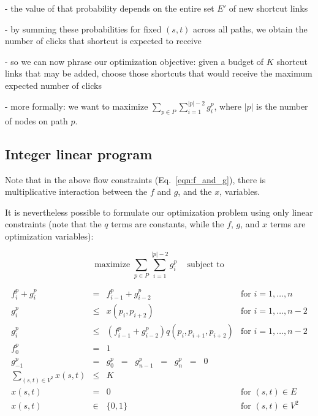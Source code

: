 \documentclass[11pt,letterpaper]{article}
\begin{document}
- the value of that probability depends on the entire set $E'$ of new shortcut links

- by summing these probabilities for fixed $(s,t)$ across all paths, we obtain the number of clicks that shortcut is expected to receive

- so we can now phrase our optimization objective: given a budget of $K$ shortcut links that may be added, choose those shortcuts that would receive the maximum expected number of clicks

- more formally: we want to maximize $\sum_{p \in P} \sum_{i=1}^{|p|-2} g^p_i$, where $|p|$ is the number of nodes on path $p$.





\subsection{Integer linear program}

Note that in the above flow constraints (Eq.~\ref{eqn:f_and_g}), there is multiplicative interaction between the $f$ and $g$, and the $x$, variables.

It is nevertheless possible to formulate our optimization problem using only linear constraints (note that the $q$ terms are constants, while the $f$, $g$, and $x$ terms are optimization variables):

\begin{equation}
\text{maximize } \sum_{p \in P} \sum_{i=1}^{|p|-2} g^p_i \;\;\; \text{ subject to}
\label{eqn:ILP_objective}
\end{equation}

\begin{equation}
\begin{array}{rlll}
f^p_i + g^p_i &=& f^p_{i-1} + g^p_{i-2} & \mbox{for $i=1,\dots,n$} \\
g^p_i &\leq& x(p_i, p_{i+2}) & \mbox{for $i=1,\dots,n-2$} \\
g^p_i &\leq& \left(f^p_{i-1} + g^p_{i-2}\right) q(p_i,p_{i+1},p_{i+2}) & \mbox{for $i=1,\dots,n-2$} \\
f^p_0 &=& 1 & \\
g^p_{-1} &=& g^p_0 \;\;=\;\; g^p_{n-1} \;\;=\;\; g^p_n \;\;=\;\; 0 & \\
\sum_{(s,t) \in V^2} x(s,t) &\leq& K &  \\
x(s,t) &=& 0 & \mbox{for $(s,t) \in E$} \\
x(s,t) &\in& \{0,1\} & \mbox{for $(s,t) \in V^2$} \\
\end{array}
\label{eqn:ILP_constraints}
\end{equation}
\end{document}
